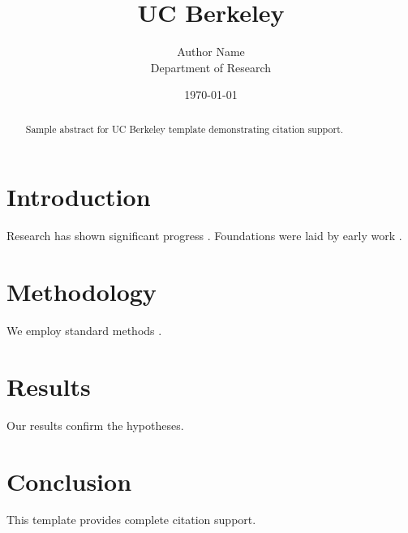 \documentclass{thesis_berkeley}
\title{UC Berkeley}
\author{Author Name \\ \small Department of Research}
\date{\today}
\begin{document}
\maketitle

\begin{abstract}
Sample abstract for UC Berkeley template demonstrating citation support.
\end{abstract}

\section{Introduction}
Research has shown significant progress \citep{einstein1905}. Foundations were laid by early work \citep{turing1950}.

\section{Methodology}
We employ standard methods \citep{knuth1984}.

\section{Results}
Our results confirm the hypotheses.

\section{Conclusion}
This template provides complete citation support.



\end{document}
